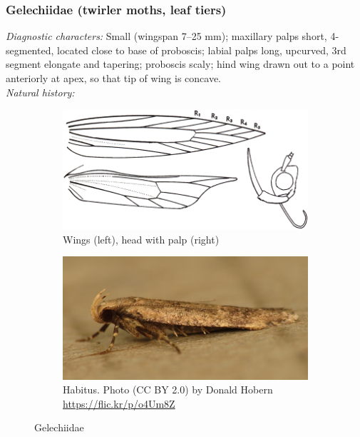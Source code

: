 \documentclass[letterpaper, 11pt]{article}
\begin{document}
\subsubsection{Gelechiidae (twirler moths, leaf tiers)}
\noindent{}\textit{Diagnostic characters:} Small (wingspan 7--25 mm); maxillary palps short, 4-segmented, located close to base of proboscis; labial palps long, upcurved, 3rd segment elongate and tapering; proboscis scaly; hind wing drawn out to a point anteriorly at apex, so that tip of wing is concave.\\

\noindent{}\textit{Natural history:} 

\begin{figure}[ht!]
    \centering
    \begin{subfigure}[ht!]{0.45\textwidth}
        \includegraphics[width=\textwidth]{image35}
        \caption{Wings (left), head with palp (right)}
        \label{fig:gelechiid1}
    \end{subfigure}
    \qquad %
    \begin{subfigure}[ht!]{0.45\textwidth}
        \includegraphics[width=\textwidth]{gelechiid}
        \caption{Habitus. Photo (CC BY 2.0) by Donald Hobern \url{https://flic.kr/p/o4Um8Z}}
        \label{fig:gelechiid2}
    \end{subfigure}
    \caption{Gelechiidae}\label{fig:gelechiids}
\end{figure}
\end{document}
